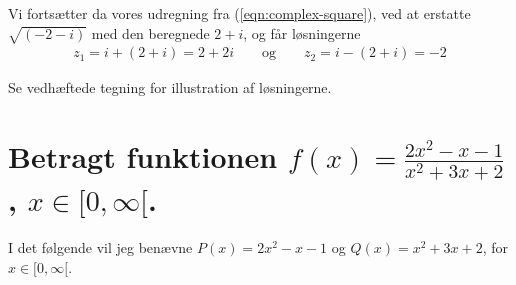 \documentclass[11pt,a4paper]{article}
\newcommand{\eqnref}[1]{(\ref{eqn:#1})}
\begin{document}
Vi fortsætter da vores udregning fra \eqnref{complex-square}, ved at erstatte
$\sqrt{(-2 - i)}$ med den beregnede $2 + i$, og får løsningerne
\begin{align}
    z_1 = i + (2 + i) = 2 + 2i
    \qquad
    \text{og}
    \qquad
    z_2 = i - (2 + i) = -2
\end{align}

Se vedhæftede tegning for illustration af løsningerne.

\clearpage
\section
{
    \mdseries
    Betragt funktionen $f(x) = \frac{2x^2 - x - 1}{x^2 + 3x + 2}$, $x \in
    [0,\infty[$.
}
I det følgende vil jeg benævne $P(x) = 2x^2 - x - 1$ og
$Q(x) = x^2 + 3x + 2$, for $x \in [0,\infty[$.
\end{document}
